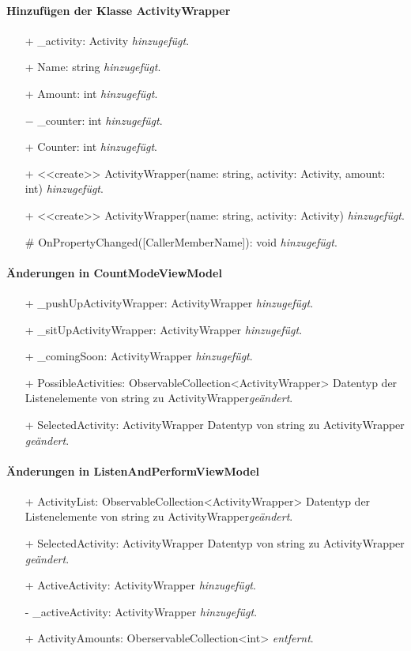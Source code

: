 \documentclass[a4paper,12pt]{article}
\begin{document}
\paragraph{Hinzufügen der Klasse ActivityWrapper}
\begin{itemize}
	\item[+] \_activity: Activity \textit{hinzugefügt}.
	\item[+] Name: string \textit{hinzugefügt}.
	\item[+] Amount: int \textit{hinzugefügt}.
	\item[$-$] \_counter: int \textit{hinzugefügt}.
	\item[+] Counter: int \textit{hinzugefügt}.
	\item[+] <<create>> ActivityWrapper(name: string, activity: Activity, amount: int) \textit{hinzugefügt}.
	\item[+] <<create>> ActivityWrapper(name: string, activity: Activity) \textit{hinzugefügt}.
	\item[\#] OnPropertyChanged([CallerMemberName]): void \textit{hinzugefügt}.
\end{itemize}
\paragraph{Änderungen in CountModeViewModel}
\begin{itemize}
	\item[+] \_pushUpActivityWrapper: ActivityWrapper \textit{hinzugefügt}.
	\item[+] \_sitUpActivityWrapper: ActivityWrapper \textit{hinzugefügt}.
	\item[+] \_comingSoon: ActivityWrapper \textit{hinzugefügt}.
	\item[+] PossibleActivities: ObservableCollection<ActivityWrapper> Datentyp der Listenelemente von string zu ActivityWrapper\textit{geändert}.
	\item[+] SelectedActivity: ActivityWrapper Datentyp von string zu ActivityWrapper \textit{geändert}.
\end{itemize}
\paragraph{Änderungen in ListenAndPerformViewModel}
\begin{itemize}
	\item[+] ActivityList: ObservableCollection<ActivityWrapper> Datentyp der Listenelemente von string zu ActivityWrapper\textit{geändert}.
	\item[+] SelectedActivity: ActivityWrapper Datentyp von string zu ActivityWrapper \textit{geändert}.
	\item[+] ActiveActivity: ActivityWrapper \textit{hinzugefügt}.
	\item[-] \_activeActivity: ActivityWrapper \textit{hinzugefügt}.
 	\item[+] ActivityAmounts: OberservableCollection<int> \textit{entfernt}. 
\end{itemize}
\end{document}
